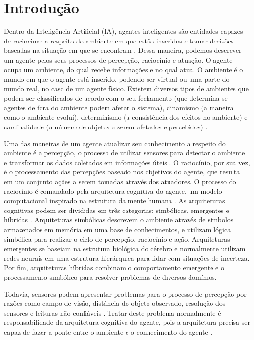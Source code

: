 \chapter{Introdução}

Dentro da Inteligência Artificial (IA), agentes inteligentes são entidades capazes de raciocinar a respeito do ambiente em que estão inseridos e tomar decisões baseadas na situação em que se encontram \cite{russell2016artificial}. Dessa maneira, podemos descrever um agente pelos seus processos de percepção, raciocínio e atuação. O agente ocupa um ambiente, do qual recebe informações e no qual atua. O ambiente é o mundo em que o agente está inserido, podendo ser virtual ou uma parte do mundo real, no caso de um agente físico. Existem diversos tipos de ambientes que podem ser classificados de acordo com o seu fechamento (que determina se agentes de fora do ambiente podem afetar o sistema), dinamismo (a maneira como o ambiente evolui), determinismo (a consistência dos efeitos no ambiente) e cardinalidade (o número de objetos a serem afetados e percebidos) \cite{moya2007towards}.

Uma das maneiras de um agente atualizar seu conhecimento a respeito do ambiente é a percepção, o processo de utilizar sensores para detectar o ambiente e transformar os dados coletados em informações úteis \cite{weyns2004towards}.  O raciocínio, por sua vez, é o processamento das percepções baseado nos objetivos do agente, que resulta em um conjunto ações a serem tomadas através dos atuadores. O processo do raciocínio é comandado pela arquitetura cognitiva do agente, um modelo computacional inspirado na estrutura da mente humana \cite{DYACHENKO2018130}. As arquiteturas cognitivas podem ser divididas em três categorias: simbólicas, emergentes e híbridas \cite{yeCognitivearchitectures}. Arquiteturas simbólicas descrevem o ambiente através de símbolos armazenados em memória em uma base de conhecimentos, e utilizam lógica simbólica para realizar o ciclo de percepção, raciocínio e ação. Arquiteturas emergentes se baseiam na estrutura biológica do cérebro e normalmente utilizam redes neurais em uma estrutura hierárquica para lidar com situações de incerteza. Por fim, arquiteturas híbridas combinam o comportamento emergente e o processamento simbólico para resolver problemas de diversos domínios. 

Todavia, sensores podem apresentar problemas para o processo de percepção por razões como campo de visão, distância do objeto observado, resolução dos sensores e leituras não confiáveis \cite{chrisman1991intelligent}. Tratar deste problema normalmente é responsabilidade da arquitetura cognitiva do agente, pois a arquitetura precisa ser capaz de fazer a ponte entre o ambiente e o conhecimento do agente \cite{langley2009cognitive}.

